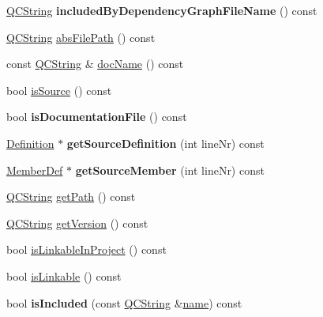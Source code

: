 \begin{DoxyCompactItemize}
\mbox{\hyperlink{class_q_c_string}{Q\+C\+String}} {\bfseries included\+By\+Dependency\+Graph\+File\+Name} () const
\item 
\mbox{\hyperlink{class_q_c_string}{Q\+C\+String}} \mbox{\hyperlink{class_file_def_ad44d91d874c4713d198a8e4b862ee48f}{abs\+File\+Path}} () const
\item 
const \mbox{\hyperlink{class_q_c_string}{Q\+C\+String}} \& \mbox{\hyperlink{class_file_def_a0ce6ecbcf84b6731120dfcd56c4dc0d6}{doc\+Name}} () const
\item 
bool \mbox{\hyperlink{class_file_def_a0e40f11b7915efcd403a679430d4ac4e}{is\+Source}} () const
\item 
\mbox{\label{class_file_def_ac8d118fc22146de5cee226108b84cbd0}} 
bool {\bfseries is\+Documentation\+File} () const
\item 
\mbox{\label{class_file_def_ad62d0ee8b3a88f12a79e44b65e08de0e}} 
\mbox{\hyperlink{class_definition}{Definition}} $\ast$ {\bfseries get\+Source\+Definition} (int line\+Nr) const
\item 
\mbox{\label{class_file_def_a21f5335e61cc9e702c65571870cd9723}} 
\mbox{\hyperlink{class_member_def}{Member\+Def}} $\ast$ {\bfseries get\+Source\+Member} (int line\+Nr) const
\item 
\mbox{\hyperlink{class_q_c_string}{Q\+C\+String}} \mbox{\hyperlink{class_file_def_a77330ac537f3a70224552c1373e03404}{get\+Path}} () const
\item 
\mbox{\hyperlink{class_q_c_string}{Q\+C\+String}} \mbox{\hyperlink{class_file_def_a8f8cd8aec9c308358c7e9e747757e3cc}{get\+Version}} () const
\item 
bool \mbox{\hyperlink{class_file_def_ad8195d5d5b2be4f11d37e8d75f9e4659}{is\+Linkable\+In\+Project}} () const
\item 
bool \mbox{\hyperlink{class_file_def_a4d175f205d548fa28fc9c5aed8095aee}{is\+Linkable}} () const
\item 
\mbox{\label{class_file_def_aa8704ac9498eaf5eec58f1b95fe71af2}} 
bool {\bfseries is\+Included} (const \mbox{\hyperlink{class_q_c_string}{Q\+C\+String}} \&\mbox{\hyperlink{class_file_def_a68f9ae783659b8c3738623edfdb6ee74}{name}}) const
\item 
\mbox{\label{class_file_def_abbf6e95cb0c5425ee0b311c5fe4cb251}} 

\end{DoxyCompactItemize}
